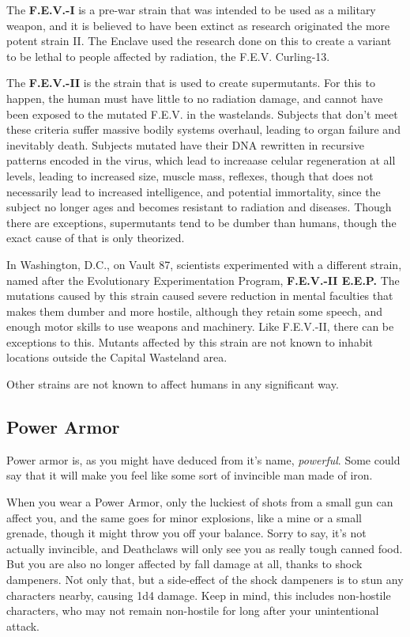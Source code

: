 The \textbf{F.E.V.-I} is a pre-war strain that was intended to be used as a military weapon, and it is believed to have been extinct as research originated the more potent strain II. The Enclave used the research done on this to create a variant to be lethal to people affected by radiation, the F.E.V. Curling-13.

The \textbf{F.E.V.-II} is the strain that is used to create supermutants. For this to happen, the human must have little to no radiation damage, and cannot have been exposed to the mutated F.E.V. in the wastelands. Subjects that don't meet these criteria suffer massive bodily systems overhaul, leading to organ failure and inevitably death. Subjects mutated have their DNA rewritten in recursive patterns encoded in the virus, which lead to increaase celular regeneration at all levels, leading to increased size, muscle mass, reflexes, though that does not necessarily lead to increased intelligence, and potential immortality, since the subject no longer ages and becomes resistant to radiation and diseases. Though there are exceptions, supermutants tend to be dumber than humans, though the exact cause of that is only theorized.

In Washington, D.C., on Vault 87, scientists experimented with a different strain, named after the  Evolutionary Experimentation Program, \textbf{F.E.V.-II E.E.P.} The mutations caused by this strain caused severe reduction in mental faculties that makes them dumber and more hostile, although they retain some speech, and enough motor skills to use weapons and machinery. Like F.E.V.-II, there can be exceptions to this. Mutants affected by this strain are not known to inhabit locations outside the Capital Wasteland area.

Other strains are not known to affect humans in any significant way.

\subsection{Power Armor}

Power armor is, as you might have deduced from it's name, \textit{powerful}. Some could say that it will make you feel like some sort of invincible man made of iron.

When you wear a Power Armor, only the luckiest of shots from a small gun can affect you, and the same goes for minor explosions, like a mine or a small grenade, though it might throw you off your balance. Sorry to say, it's not actually invincible, and Deathclaws will only see you as really tough canned food. But you are also no longer affected by fall damage at all, thanks to shock dampeners. Not only that, but a side-effect of the shock dampeners is to stun any characters nearby, causing 1d4 damage. Keep in mind, this includes non-hostile characters, who may not remain non-hostile for long after your unintentional attack.

